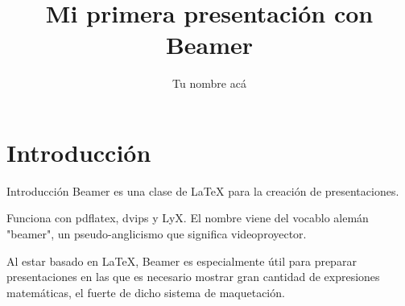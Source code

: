 \documentclass[a4paper,10pt]{beamer}
\begin{document}
\begin{frame}
\title{Mi primera presentaci\'on con Beamer}
\author{Tu nombre ac\'a}
\date{}
\maketitle
\end{frame}

\section[\'Indice]{}

\section{Introducci\'on}
\begin{frame}{Introducci\'on}
\justify
Beamer es una clase de LaTeX para la creaci\'on de
presentaciones.

\vspace{0.3cm}
\begin{justify}
Funciona con pdflatex, dvips y LyX. El nombre 
viene del vocablo alem\'an "beamer", un pseudo-anglicismo 
que significa videoproyector. 

\vspace{0.3cm}

Al estar basado en LaTeX, Beamer es especialmente 
\'util para preparar presentaciones en las que es 
necesario mostrar gran cantidad de expresiones
matem\'aticas,  el fuerte de dicho sistema de maquetaci\'on.
\end{justify}

\end{frame}
\end{document}
